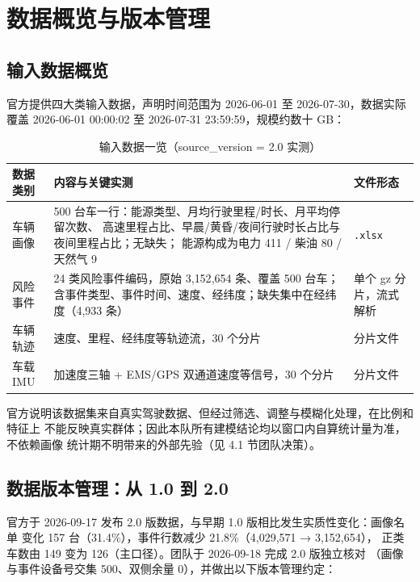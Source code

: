 \section{数据概览与版本管理}

\subsection{输入数据概览}

官方提供四大类输入数据，声明时间范围为 2026-06-01 至 2026-07-30，数据实际
覆盖 2026-06-01 00:00:02 至 2026-07-31 23:59:59，规模约数十 GB：

\begin{table}[H]
\centering
\caption{输入数据一览（source\_version = 2.0 实测）}
\label{tab:input-data}
\small
\begin{tabularx}{\textwidth}{lLl}
\toprule
数据类别 & 内容与关键实测 & 文件形态 \\
\midrule
车辆画像 & 500 台车一行：能源类型、月均行驶里程/时长、月平均停留次数、
高速里程占比、早晨/黄昏/夜间行驶时长占比与夜间里程占比；无缺失；
能源构成为电力 411 / 柴油 80 / 天然气 9 & \texttt{.xlsx} \\
风险事件 & 24 类风险事件编码，原始 3{,}152{,}654 条、覆盖 500 台车；
含事件类型、事件时间、速度、经纬度；缺失集中在经纬度（4{,}933 条） &
单个 gz 分片，流式解析 \\
车辆轨迹 & 速度、里程、经纬度等轨迹流，30 个分片 & 分片文件 \\
车载 IMU & 加速度三轴 + EMS/GPS 双通道速度等信号，30 个分片 & 分片文件 \\
\bottomrule
\end{tabularx}
\end{table}

官方说明该数据集来自真实驾驶数据、但经过筛选、调整与模糊化处理，在比例和特征上
不能反映真实群体；因此本队所有建模结论均以窗口内自算统计量为准，不依赖画像
统计期不明带来的外部先验（见 4.1 节团队决策）。

\subsection{数据版本管理：从 1.0 到 2.0}

官方于 2026-09-17 发布 2.0 版数据，与早期 1.0 版相比发生实质性变化：画像名单
变化 157 台（31.4\%），事件行数减少 21.8\%（4{,}029{,}571 → 3{,}152{,}654），
正类车数由 149 变为 126（主口径）。团队于 2026-09-18 完成 2.0 版独立核对
（画像与事件设备号交集 500、双侧余量 0），并做出以下版本管理约定：

